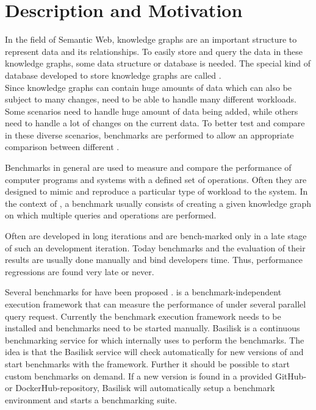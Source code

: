 \chapter{Description and Motivation}
\label{ch:description}

In the field of Semantic Web, knowledge graphs are an important structure to represent data and its relationships.
To easily store and query the data in these knowledge graphs, some data structure or database is needed.
The special kind of database developed to store knowledge graphs are called \tsp{}. \\

Since knowledge graphs can contain huge amounts of data which can also be subject to many changes, \tsp{} need to be able to handle many different workloads.
Some scenarios need to handle huge amount of data being added, while others need to handle a lot of changes on the current data.
To better test and compare \tsp{} in these diverse scenarios, benchmarks are performed to allow an appropriate comparison between different \tsp{}\cite{saleemHowRepresentativeSPARQL2019}.

Benchmarks in general are used to measure and compare the performance of computer programs and systems with a defined set of operations.
Often they are designed to mimic and reproduce a particular type of workload to the system.
In the context of \tsp{}, a benchmark usually consists of creating a given knowledge graph on which multiple queries and operations are performed.

Often \tsp{} are developed in long iterations and are bench-marked only in a late stage of such an development iteration.
Today benchmarks and the evaluation of their results are usually done manually and bind developers time.
Thus, performance regressions are  found very late or never.


Several benchmarks for \tsp{} have been proposed \cite{saleemHowRepresentativeSPARQL2019}.
\iguana{} is a benchmark-independent execution framework \cite{conradsIguanaGenericFramework2017} that can measure the performance of \tsp{} under several parallel query request.
Currently the benchmark execution framework needs to be installed and benchmarks need to be started manually.
Basilisk is a continuous benchmarking service for \tsp{} which internally uses \iguana{} to perform the benchmarks.
The idea is that the Basilisk service will check automatically for new versions of \tsp{} and start benchmarks with the \iguana{} framework.
Further it should be possible to start custom benchmarks on demand.
If a new version is found in a provided GitHub- or DockerHub-repository, Basilisk will automatically setup a benchmark environment and starts a benchmarking suite.

